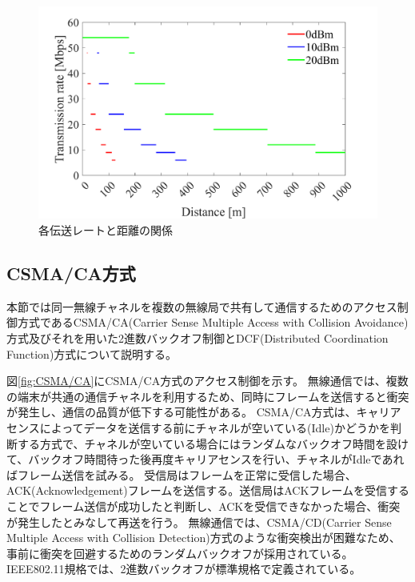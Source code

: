 \documentclass[a4paper,10.5pt]{ltjsarticle}
\begin{document}
\begin{figure}[H]
  \centering
  \includegraphics[width=\linewidth]{rate_vs_distance_2.pdf} %
  \caption{各伝送レートと距離の関係}
  \label{fig:rate_vs_distance_2} %
\end{figure}

\clearpage
\subsection{CSMA/CA方式}
本節では同一無線チャネルを複数の無線局で共有して通信するためのアクセス制御方式であるCSMA/CA(Carrier Sense Multiple Access with Collision Avoidance)方式及びそれを用いた2進数バックオフ制御とDCF(Distributed Coordination Function)方式について説明する。

図\ref{fig:CSMA/CA}にCSMA/CA方式のアクセス制御を示す。
無線通信では、複数の端末が共通の通信チャネルを利用するため、同時にフレームを送信すると衝突が発生し、通信の品質が低下する可能性がある。
CSMA/CA方式は、キャリアセンスによってデータを送信する前にチャネルが空いている(Idle)かどうかを判断する方式で、チャネルが空いている場合にはランダムなバックオフ時間を設けて、バックオフ時間待った後再度キャリアセンスを行い、チャネルがIdleであればフレーム送信を試みる。
受信局はフレームを正常に受信した場合、ACK(Acknowledgement)フレームを送信する。送信局はACKフレームを受信することでフレーム送信が成功したと判断し、ACKを受信できなかった場合、衝突が発生したとみなして再送を行う。
無線通信では、CSMA/CD(Carrier Sense Multiple Access with Collision Detection)方式のような衝突検出が困難なため、事前に衝突を回避するためのランダムバックオフが採用されている。
IEEE802.11規格では、2進数バックオフが標準規格で定義されている。
\end{document}
